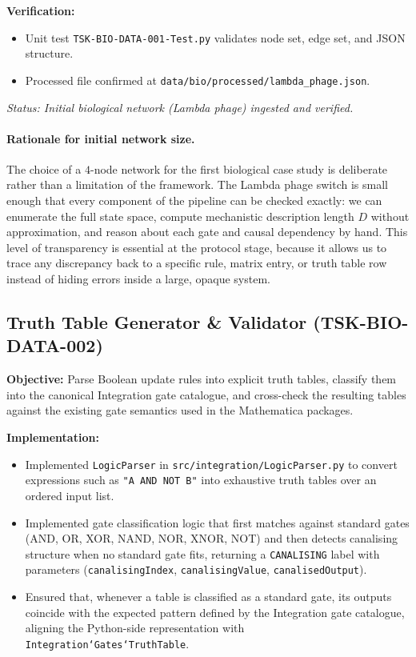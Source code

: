 \documentclass{article}
\begin{document}
\textbf{Verification:}
\begin{itemize}
    \item Unit test \texttt{TSK-BIO-DATA-001-Test.py} validates node set, edge set, and JSON structure.
    \item Processed file confirmed at \texttt{data/bio/processed/lambda\_phage.json}.
\end{itemize}
\textit{Status: Initial biological network (Lambda phage) ingested and verified.}

\paragraph{Rationale for initial network size.}
The choice of a $4$-node network for the first biological case study is deliberate rather than a limitation of the framework. The Lambda phage switch is small enough that every component of the pipeline can be checked exactly: we can enumerate the full state space, compute mechanistic description length $D$ without approximation, and reason about each gate and causal dependency by hand. This level of transparency is essential at the protocol stage, because it allows us to trace any discrepancy back to a specific rule, matrix entry, or truth table row instead of hiding errors inside a large, opaque system.

\subsection{Truth Table Generator \& Validator (TSK-BIO-DATA-002)}
\textbf{Objective:} Parse Boolean update rules into explicit truth tables, classify them into the canonical Integration gate catalogue, and cross-check the resulting tables against the existing gate semantics used in the Mathematica packages.

\textbf{Implementation:}
\begin{itemize}
    \item Implemented \texttt{LogicParser} in \texttt{src/integration/LogicParser.py} to convert expressions such as \texttt{"A AND NOT B"} into exhaustive truth tables over an ordered input list.
    \item Implemented gate classification logic that first matches against standard gates (AND, OR, XOR, NAND, NOR, XNOR, NOT) and then detects canalising structure when no standard gate fits, returning a \texttt{CANALISING} label with parameters (\texttt{canalisingIndex}, \texttt{canalisingValue}, \texttt{canalisedOutput}).
    \item Ensured that, whenever a table is classified as a standard gate, its outputs coincide with the expected pattern defined by the Integration gate catalogue, aligning the Python-side representation with \texttt{Integration`Gates`TruthTable}.
\end{itemize}
\end{document}
